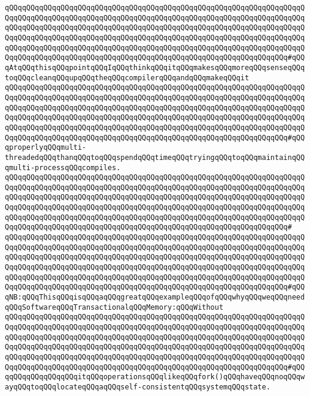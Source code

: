 \verb|qQQqqQQqqQQqqQQqqQQqqQQqqQQqqQQqqQQqqQQqqQQqqQQqqQQqqQQqqQQqqQQqqQQqqQQqqQQqqQQqqQQqqQQqqQQqqQQqqQQqqQQqqQQqqQQqqQQqqQQqqQQqqQQqqQQqqQQqqQQqqQQqqQQqqQQqqQQqqQQqqQQqqQQqqQQqqQQqqQQqqQQqqQQqqQQqqQQqqQQqqQQqqQQqqQQqqQQqqQQqqQQqqQQqqQQqqQQqqQQqqQQqqQQqqQQqqQQqqQQqqQQqqQQqqQQqqQQqqQQqqQQqqQQqqQQqqQQqqQQqqQQqqQQqqQQqqQQqqQQqqQQqqQQqqQQqqQQqqQQqqQQqqQQqqQQqqQQqqQQqqQQqqQQqqQQqqQQqqQQqqQQqqQQqqQQqqQQqqQQqqQQqqQQqqQQqqQQq#qQQqAtqQQqthisqQQqpointqQQqIqQQqthinkqQQqitqQQqmakesqQQqmoreqQQqsenseqQQqtoqQQqcleanqQQqupqQQqtheqQQqcompilerqQQqandqQQqmakeqQQqit|\newline
\verb|qQQqqQQqqQQqqQQqqQQqqQQqqQQqqQQqqQQqqQQqqQQqqQQqqQQqqQQqqQQqqQQqqQQqqQQqqQQqqQQqqQQqqQQqqQQqqQQqqQQqqQQqqQQqqQQqqQQqqQQqqQQqqQQqqQQqqQQqqQQqqQQqqQQqqQQqqQQqqQQqqQQqqQQqqQQqqQQqqQQqqQQqqQQqqQQqqQQqqQQqqQQqqQQqqQQqqQQqqQQqqQQqqQQqqQQqqQQqqQQqqQQqqQQqqQQqqQQqqQQqqQQqqQQqqQQqqQQqqQQqqQQqqQQqqQQqqQQqqQQqqQQqqQQqqQQqqQQqqQQqqQQqqQQqqQQqqQQqqQQqqQQqqQQqqQQqqQQqqQQqqQQqqQQqqQQqqQQqqQQqqQQqqQQqqQQqqQQqqQQqqQQqqQQqqQQqqQQq#qQQqproperlyqQQqmulti-threadedqQQqthanqQQqtoqQQqspendqQQqtimeqQQqtryingqQQqtoqQQqmaintainqQQqmulti-processqQQqcompiles.|\newline
\verb|qQQqqQQqqQQqqQQqqQQqqQQqqQQqqQQqqQQqqQQqqQQqqQQqqQQqqQQqqQQqqQQqqQQqqQQqqQQqqQQqqQQqqQQqqQQqqQQqqQQqqQQqqQQqqQQqqQQqqQQqqQQqqQQqqQQqqQQqqQQqqQQqqQQqqQQqqQQqqQQqqQQqqQQqqQQqqQQqqQQqqQQqqQQqqQQqqQQqqQQqqQQqqQQqqQQqqQQqqQQqqQQqqQQqqQQqqQQqqQQqqQQqqQQqqQQqqQQqqQQqqQQqqQQqqQQqqQQqqQQqqQQqqQQqqQQqqQQqqQQqqQQqqQQqqQQqqQQqqQQqqQQqqQQqqQQqqQQqqQQqqQQqqQQqqQQqqQQqqQQqqQQqqQQqqQQqqQQqqQQqqQQqqQQqqQQqqQQqqQQqqQQqqQQqqQQqqQQq#|\newline
\verb|qQQqqQQqqQQqqQQqqQQqqQQqqQQqqQQqqQQqqQQqqQQqqQQqqQQqqQQqqQQqqQQqqQQqqQQqqQQqqQQqqQQqqQQqqQQqqQQqqQQqqQQqqQQqqQQqqQQqqQQqqQQqqQQqqQQqqQQqqQQqqQQqqQQqqQQqqQQqqQQqqQQqqQQqqQQqqQQqqQQqqQQqqQQqqQQqqQQqqQQqqQQqqQQqqQQqqQQqqQQqqQQqqQQqqQQqqQQqqQQqqQQqqQQqqQQqqQQqqQQqqQQqqQQqqQQqqQQqqQQqqQQqqQQqqQQqqQQqqQQqqQQqqQQqqQQqqQQqqQQqqQQqqQQqqQQqqQQqqQQqqQQqqQQqqQQqqQQqqQQqqQQqqQQqqQQqqQQqqQQqqQQqqQQqqQQqqQQqqQQqqQQqqQQqqQQqqQQq#qQQqNB:qQQqThisqQQqisqQQqaqQQqgreatqQQqexampleqQQqofqQQqwhyqQQqweqQQqneedqQQqSoftwareqQQqTransactionalqQQqMemory:qQQqWithout|\newline
\verb|qQQqqQQqqQQqqQQqqQQqqQQqqQQqqQQqqQQqqQQqqQQqqQQqqQQqqQQqqQQqqQQqqQQqqQQqqQQqqQQqqQQqqQQqqQQqqQQqqQQqqQQqqQQqqQQqqQQqqQQqqQQqqQQqqQQqqQQqqQQqqQQqqQQqqQQqqQQqqQQqqQQqqQQqqQQqqQQqqQQqqQQqqQQqqQQqqQQqqQQqqQQqqQQqqQQqqQQqqQQqqQQqqQQqqQQqqQQqqQQqqQQqqQQqqQQqqQQqqQQqqQQqqQQqqQQqqQQqqQQqqQQqqQQqqQQqqQQqqQQqqQQqqQQqqQQqqQQqqQQqqQQqqQQqqQQqqQQqqQQqqQQqqQQqqQQqqQQqqQQqqQQqqQQqqQQqqQQqqQQqqQQqqQQqqQQqqQQqqQQqqQQqqQQqqQQqqQQq#qQQqqQQqqQQqqQQqqQQqitqQQqoperationsqQQqlikeqQQqfork()qQQqhaveqQQqnoqQQqwayqQQqtoqQQqlocateqQQqaqQQqself-consistentqQQqsystemqQQqstate.|\newline
